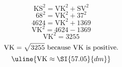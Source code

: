 \[\text{KS}^{2}=\text{VK}^{2}+\text{SV}^{2}\]
\[68^{2}=\text{VK}^{2}+37^{2}\]
\[4624=\text{VK}^{2}+1369\]
\[\text{VK}^{2}=4624-1369\]
\[\text{VK}^{2}=3255\]
\[\text{VK}=\sqrt{\mathstrut 3255}\text{ because VK is positive.}\]
\[\uline{\text{VK}\approx\SI{57.05}{dm}}\]
